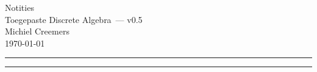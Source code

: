 \documentclass[11pt, oneside, parskip=half]{scrartcl}
\newcommand{\coursename}{Toegepaste Discrete Algebra}
\newcommand{\doctitle}{Notities}
\newcommand{\docversion}{v0.5}
\newcommand{\docauthor}{Michiel Creemers}
\begin{document}
\begin{center}
  {\LARGE \doctitle}\\[0.2em]
  {\large \coursename\ — \docversion}\\[0.2em]
  {\large \docauthor} \\
  {\small \today}
\end{center}
\vspace{0.5em}
\hrule
\vspace{1em}

\boxedcontents %
\vspace{1em}\hrule\vspace{1em}

%

\newpage


\newpage


\newpage


\newpage


\newpage


\newpage


\newpage


\newpage


\newpage


\newpage


\end{document}
